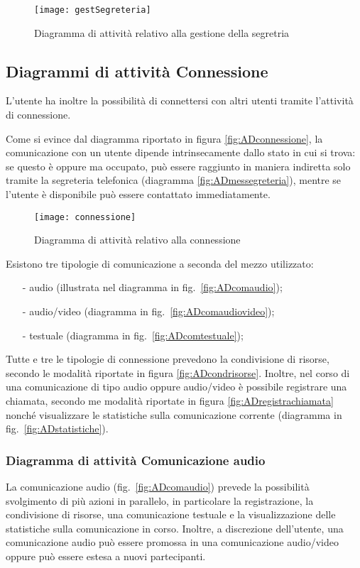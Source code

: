 \begin{figure}[H]
  \centering
  \texttt{[image: gestSegreteria]}
  \caption{Diagramma di attività relativo alla gestione della segretria}\label{fig:ADgestionesegreteria}
\end{figure}

\subsection{Diagrammi di attività Connessione}
L'utente ha inoltre la possibilità di connettersi con altri utenti tramite l'attività di connessione.

Come si evince dal diagramma riportato in figura \vref{fig:ADconnessione}, la comunicazione con un utente dipende intrinsecamente dallo stato in cui si trova: se questo è  oppure  ma occupato, può essere raggiunto in maniera indiretta solo tramite la segreteria telefonica (diagramma \ref{fig:ADmessegreteria}), mentre se l'utente è disponibile può essere contattato immediatamente.

\begin{figure}[H]
  \centering
  \texttt{[image: connessione]}
  \caption{Diagramma di attività relativo alla connessione}\label{fig:ADconnessione}
\end{figure}

Esistono tre tipologie di comunicazione a seconda del mezzo utilizzato:
\begin{itemize}[noitemsep,nolistsep]
  \item[-] audio (illustrata nel diagramma in fig.~\ref{fig:ADcomaudio});
  \item[-] audio/video (diagramma in fig.~\ref{fig:ADcomaudiovideo});
  \item[-] testuale (diagramma in fig.~\ref{fig:ADcomtestuale});
\end{itemize}


Tutte e tre le tipologie di connessione prevedono la condivisione di risorse, secondo le modalità riportate in figura \ref{fig:ADcondrisorse}. Inoltre, nel corso di una comunicazione di tipo audio oppure audio/video è possibile registrare una chiamata, secondo me modalità riportate in figura \ref{fig:ADregistrachiamata} nonché visualizzare le statistiche sulla comunicazione corrente (diagramma in fig.~\vref{fig:ADstatistiche}).

\subsubsection{Diagramma di attività Comunicazione audio}
La comunicazione audio (fig.~\vref{fig:ADcomaudio}) prevede la possibilità svolgimento di più azioni in parallelo, in particolare la registrazione, la condivisione di risorse, una comunicazione testuale e la visualizzazione delle statistiche sulla comunicazione in corso. Inoltre, a discrezione dell'utente, una comunicazione audio può essere promossa in una comunicazione audio/video oppure può essere estesa a nuovi partecipanti.

